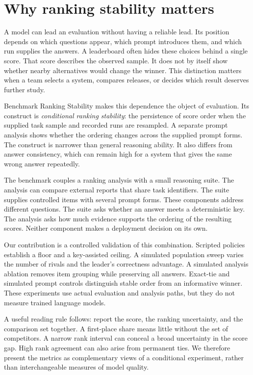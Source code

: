 \documentclass{article}
\title{\PaperTitle}
\author{Pooria Arab\\Independent researcher\\ORCID: \AuthorOrcid}
\begin{document}
\maketitle
\begin{abstract}\PaperAbstract\end{abstract}
\section{Why ranking stability matters}
A model can lead an evaluation without having a reliable lead. Its position depends on which questions appear, which prompt introduces them, and which run supplies the answers. A leaderboard often hides these choices behind a single score. That score describes the observed sample. It does not by itself show whether nearby alternatives would change the winner. This distinction matters when a team selects a system, compares releases, or decides which result deserves further study.\par
Benchmark Ranking Stability makes this dependence the object of evaluation. Its construct is \emph{conditional ranking stability}: the persistence of score order when the supplied task sample and recorded runs are resampled. A separate prompt analysis shows whether the ordering changes across the supplied prompt forms. The construct is narrower than general reasoning ability. It also differs from answer consistency, which can remain high for a system that gives the same wrong answer repeatedly.\par
The benchmark couples a ranking analysis with a small reasoning suite. The analysis can compare external reports that share task identifiers. The suite supplies controlled items with several prompt forms. These components address different questions. The suite asks whether an answer meets a deterministic key. The analysis asks how much evidence supports the ordering of the resulting scores. Neither component makes a deployment decision on its own.\par
Our contribution is a controlled validation of this combination. Scripted policies establish a floor and a key-assisted ceiling. A simulated population sweep varies the number of rivals and the leader's correctness advantage. A simulated analysis ablation removes item grouping while preserving all answers. Exact-tie and simulated prompt controls distinguish stable order from an informative winner. These experiments use actual evaluation and analysis paths, but they do not measure trained language models.\par
A useful reading rule follows: report the score, the ranking uncertainty, and the comparison set together. A first-place share means little without the set of competitors. A narrow rank interval can conceal a broad uncertainty in the score gap. High rank agreement can also arise from permanent ties. We therefore present the metrics as complementary views of a conditional experiment, rather than interchangeable measures of model quality.\par
\end{document}
